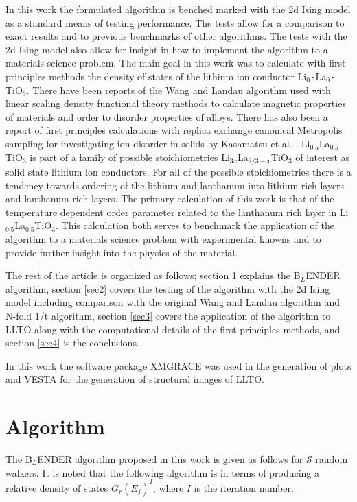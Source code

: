 \documentclass[aps,pre,reprint,superscriptaddress,showkeys]{revtex4-1}
\begin{document}
   In this work the formulated algorithm is benched marked with the 2d Ising model as a standard means of testing  performance.  The tests allow for a comparison to exact results and to previous benchmarks of other algorithms. The tests with the 2d Ising model also allow for insight in how to implement the algorithm to a materials science problem. The main goal in this work  was to calculate with first principles methods the  density of states of the lithium ion conductor Li$_{0.5}$La$_{0.5}$TiO$_3$. There  have been  reports of the Wang and Landau algorithm used with linear scaling density functional theory methods to calculate magnetic properties of materials and order to disorder properties of alloys\cite{Eisenbach, FP_Wang_Landau_CuZn}. There has also been a report of first principles calculations with replica exchange canonical Metropolis sampling for investigating ion disorder in solids by Kasamatsu et al. \cite{ion_disorder_replica}.  Li$_{0.5}$La$_{0.5}$TiO$_3$ is part of a family of possible stoichiometries Li$_{3x}$La$_{2/3 -x}$TiO$_3$ of interest as solid state lithium ion conductors\cite{domainboundaries,P4mmmstrucuture,imaginary_phonons,GENG2009555,peculiarities,LLTOreview,Li_La_ordering_computational}. For all of the possible stoichiometries there is a tendency towards ordering of the lithium and lanthanum into lithium rich layers and lanthanum rich layers.  The primary calculation of this work is that of the temperature dependent order parameter related to the lanthanum rich layer in Li$_{0.5}$La$_{0.5}$TiO$_3$. This calculation both serves to benchmark the application of the algorithm to a materials science problem with experimental knowns and to provide further insight into the physics of the material. 
   
   The rest of the article is organized as follows; section \ref{sec1} explains the B$_{L}$ENDER algorithm, section \ref{sec2} covers the testing of the algorithm with the 2d Ising model including comparison with the original Wang and Landau algorithm and N-fold 1/t algorithm, section \ref{sec3} covers the application of the algorithm to LLTO along with the computational details of the first principles methods, and section \ref{sec4} is the conclusions. 
   
   In this work the software package XMGRACE\cite{XMGRACE} was used in the generation of plots and VESTA\cite{Vesta}  for the generation of structural images of LLTO.

\section{Algorithm}
\label{sec1}
The B$_{L}$ENDER algorithm proposed in this work  is given as follows for $\mathcal{S}$ random walkers. It is noted that the following algorithm is in terms of producing a relative density of states $G_{r}(E_j)^I$, where $I$ is the iteration number. 
\end{document}
